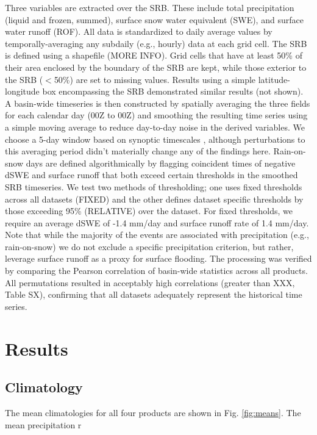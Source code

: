 \documentclass[draft]{agujournal2019}
\begin{document}
Three variables are extracted over the SRB. These include total precipitation (liquid and frozen, summed), surface snow water equivalent (SWE), and surface water runoff (ROF). All data is standardized to daily average values by temporally-averaging any subdaily (e.g., hourly) data at each grid cell. The SRB is defined using a shapefile (MORE INFO). Grid cells that have at least 50\% of their area enclosed by the boundary of the SRB are kept, while those exterior to the SRB ($<$50\%) are set to missing values. Results using a simple latitude-longitude box encompassing the SRB demonstrated similar results (not shown). A basin-wide timeseries is then constructed by spatially averaging the three fields for each calendar day (00Z to 00Z) and smoothing the resulting time series using a simple moving average to reduce day-to-day noise in the derived variables. We choose a 5-day window based on synoptic timescales \citep{holton2004introduction}, although perturbations to this averaging period didn't materially change any of the findings here. Rain-on-snow days are defined algorithmically by flagging coincident times of negative dSWE and surface runoff that both exceed certain thresholds in the smoothed SRB timeseries. We test two methods of thresholding; one uses fixed thresholds across all datasets (FIXED) and the other defines dataset specific thresholds by those exceeding 95\% (RELATIVE) over the dataset. For fixed thresholds, we require an average dSWE of -1.4 mm/day and surface runoff rate of 1.4 mm/day. Note that while the majority of the events are associated with precipitation (e.g., rain-on-snow) we do not exclude a specific precipitation criterion, but rather, leverage surface runoff as a proxy for surface flooding. The processing was verified by comparing the Pearson correlation of basin-wide statistics across all products. All permutations resulted in acceptably high correlations (greater than XXX, Table SX), confirming that all datasets adequately represent the historical time series.

\section{Results}

\subsection{Climatology}

The mean climatologies for all four products are shown in Fig. \ref{fig:means}. The mean precipitation r
\end{document}
